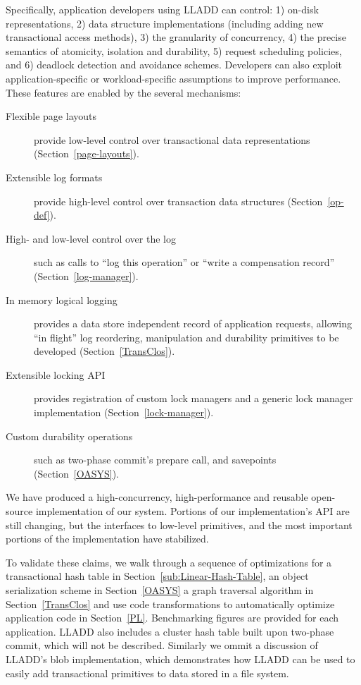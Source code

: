 \documentclass[10pt,letterpaper,twocolumn,english]{article}
\newcommand{\yad}{LLADD\xspace}
\begin{document}
Specifically, application developers using \yad can control: 1)
on-disk representations, 2) data structure implementations (including
adding new transactional access methods), 3) the granularity of
concurrency, 4) the precise semantics of atomicity, isolation and
durability, 5) request scheduling policies, and 6) deadlock detection and avoidance schemes.  Developers
can also exploit application-specific or workload-specific assumptions
to improve performance.
These features are enabled by the several mechanisms:
\begin{description}
\item[Flexible page layouts] provide low-level control over 
      transactional data representations (Section~\ref{page-layouts}).
\item[Extensible log formats] provide high-level control over
      transaction data structures (Section~\ref{op-def}).
\item [High- and low-level control over the log] such as calls to ``log this
      operation'' or ``write a compensation record'' (Section~\ref{log-manager}).
\item [In memory logical logging] provides a data store independent
      record of application requests, allowing ``in flight'' log
      reordering, manipulation and durability primitives to be
      developed (Section~\ref{TransClos}).
\item[Extensible locking API] provides registration of custom lock managers
      and a generic lock manager implementation (Section~\ref{lock-manager}).
\item[Custom durability operations] such as two-phase commit's
      prepare call, and savepoints (Section~\ref{OASYS}).
\end{description}

We have produced a high-concurrency, high-performance and reusable
open-source implementation of our system.  Portions of our
implementation's API are still changing, but the interfaces 
to low-level primitives, and the most important portions of the implementation have stabilized.  

To validate these claims, we walk
through a sequence of optimizations for a transactional hash
table in Section~\ref{sub:Linear-Hash-Table}, an object serialization 
scheme in Section~\ref{OASYS} a graph traversal algorithm in 
Section~\ref{TransClos} and use code transformations to automatically optimize application code in Section~\ref{PL}.  Benchmarking figures are provided for each 
application.  \yad also includes a cluster hash table 
built upon two-phase commit, which will not be described.  Similarly we ommit a discussion of \yad's 
blob implementation, which demonstrates how \yad can
be used to easily add transactional primitives to data stored in a file system.
\end{document}
